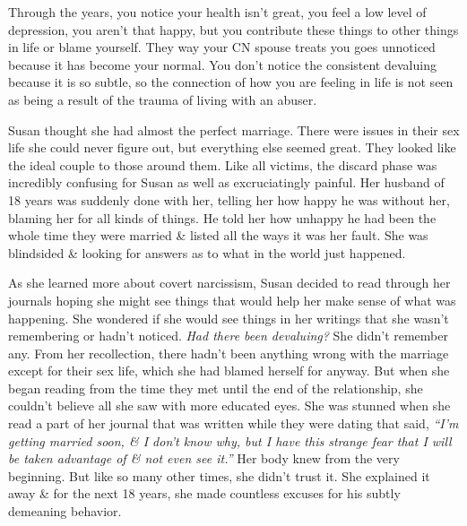\documentclass{article}
\numberwithin{equation}{section}
\begin{document}
Through the years, you notice your health isn't great, you feel a low level of depression, you aren't that happy, but you contribute these things to other things in life or blame yourself. They way your CN spouse treats you goes unnoticed because it has become your normal. You don't notice the consistent devaluing because it is so subtle, so the connection of how you are feeling in life is not seen as being a result of the trauma of living with an abuser.

Susan thought she had almost the perfect marriage. There were issues in their sex life she could never figure out, but everything else seemed great. They looked like the ideal couple to those around them. Like all victims, the discard phase was incredibly confusing for Susan as well as excruciatingly painful. Her husband of 18 years was suddenly done with her, telling her how happy he was without her, blaming her for all kinds of things. He told her how unhappy he had been the whole time they were married \& listed all the ways it was her fault. She was blindsided \& looking for answers as to what in the world just happened.

As she learned more about covert narcissism, Susan decided to read through her journals hoping she might see things that would help her make sense of what was happening. She wondered if she would see things in her writings that she wasn't remembering or hadn't noticed. \textit{Had there been devaluing?} She didn't remember any. From her recollection, there hadn't been anything wrong with the marriage except for their sex life, which she had blamed herself for anyway. But when she began reading from the time they met until the end of the relationship, she couldn't believe all she saw with more educated eyes. She was stunned when she read a part of her journal that was written while they were dating that said, \textit{``I'm getting married soon, \& I don't know why, but I have this strange fear that I will be taken advantage of \& not even see it.''} Her body knew from the very beginning. But like so many other times, she didn't trust it. She explained it away \& for the next 18 years, she made countless excuses for his subtly demeaning behavior.
\end{document}
